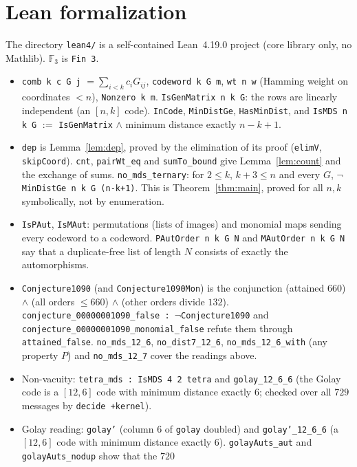 \documentclass[11pt]{article}
\theoremstyle{remark}
\newcommand{\F}{\mathbb{F}_3}
\begin{document}
\section{Lean formalization}
The directory \texttt{lean4/} is a self-contained Lean~4.19.0 project (core
library only, no Mathlib). $\F$ is \texttt{Fin 3}.
\begin{itemize}
\item \texttt{comb k c G j} $=\sum_{i<k}c_iG_{ij}$, \texttt{codeword k G m},
\texttt{wt n w} (Hamming weight on coordinates $<n$), \texttt{Nonzero k m}.
\texttt{IsGenMatrix n k G}: the rows are linearly independent (an $[n,k]$ code).
\texttt{InCode}, \texttt{MinDistGe}, \texttt{HasMinDist}, and
\texttt{IsMDS n k G} $:=$ \texttt{IsGenMatrix} $\wedge$ minimum distance
exactly $n-k+1$.
\item \texttt{dep} is Lemma~\ref{lem:dep}, proved by the elimination of its
proof (\texttt{elimV}, \texttt{skipCoord}). \texttt{cnt}, \texttt{pairWt\_eq}
and \texttt{sumTo\_bound} give Lemma~\ref{lem:count} and the exchange of sums.
\texttt{no\_mds\_ternary}: for $2\le k$, $k+3\le n$ and every $G$,
$\neg$\texttt{MinDistGe n k G (n-k+1)}. This is Theorem~\ref{thm:main}, proved
for all $n,k$ symbolically, not by enumeration.
\item \texttt{IsPAut}, \texttt{IsMAut}: permutations (lists of images) and
monomial maps sending every codeword to a codeword. \texttt{PAutOrder n k G N}
and \texttt{MAutOrder n k G N} say that a duplicate-free list of length $N$
consists of exactly the automorphisms.
\item \texttt{Conjecture1090} (and \texttt{Conjecture1090Mon}) is the conjunction
(attained $660$) $\wedge$ (all orders $\le660$) $\wedge$ (other orders divide
$132$). \texttt{conjecture\_00000001090\_false : $\neg$Conjecture1090} and
\texttt{conjecture\_00000001090\_monomial\_false} refute them through
\texttt{attained\_false}. \texttt{no\_mds\_12\_6}, \texttt{no\_dist7\_12\_6},
\texttt{no\_mds\_12\_6\_with} (any property $P$) and \texttt{no\_mds\_12\_7}
cover the readings above.
\item Non-vacuity: \texttt{tetra\_mds : IsMDS 4 2 tetra} and
\texttt{golay\_12\_6\_6} (the Golay code is a $[12,6]$ code with minimum distance
exactly $6$; checked over all $729$ messages by \texttt{decide +kernel}).
\item Golay reading: \texttt{golay'} (column $6$ of \texttt{golay} doubled) and
\texttt{golay'\_12\_6\_6} (a $[12,6]$ code with minimum distance exactly $6$).
\texttt{golayAuts\_aut} and \texttt{golayAuts\_nodup} show that the $720$

\end{itemize}
\end{document}
